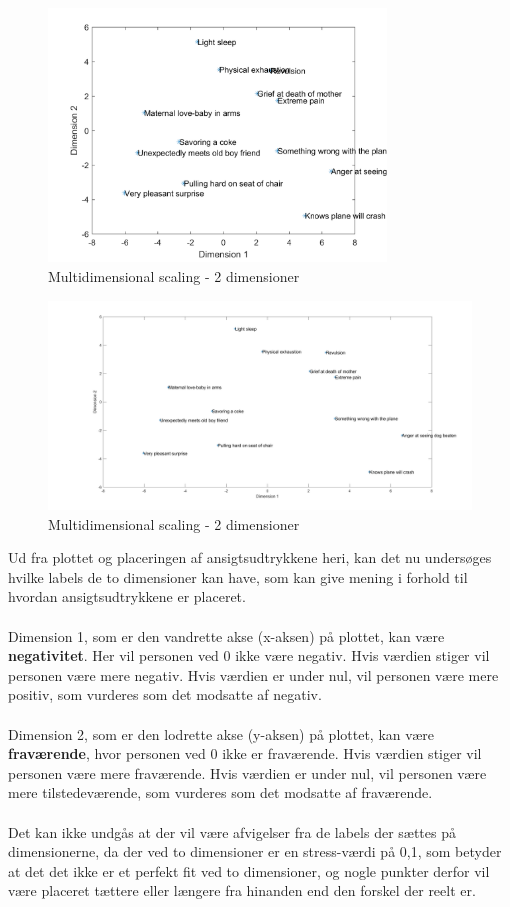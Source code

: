 \begin{figure}[H]
\centering
\includegraphics[width = 0.8\textwidth]{Figure/multidimensional.png} 
\caption{Multidimensional scaling - 2 dimensioner}
\label{fig:MDS}
\end{figure}

\begin{figure}[H]
\centering
\includegraphics[width = 1.5\textwidth]{Figure/MDS_plot} 
\caption{Multidimensional scaling - 2 dimensioner}
\label{fig:MDS}
\end{figure}

\noindent Ud fra plottet og placeringen af ansigtsudtrykkene heri, kan det nu undersøges hvilke labels de to dimensioner kan have, som kan give mening i forhold til hvordan ansigtsudtrykkene er placeret. 
\\\\
Dimension 1, som er den vandrette akse (x-aksen) på plottet, kan være \textbf{negativitet}. Her vil personen ved 0 ikke være negativ. Hvis værdien stiger vil personen være mere negativ. Hvis værdien er under nul, vil personen være mere positiv, som vurderes som det modsatte af negativ. 
\\\\
Dimension 2, som er den lodrette akse (y-aksen) på plottet, kan være \textbf{fraværende}, hvor personen ved 0 ikke er fraværende. Hvis værdien stiger vil personen være mere fraværende. Hvis værdien er under nul, vil personen være mere tilstedeværende, som vurderes som det modsatte af fraværende. 
\\\\
Det kan ikke undgås at der vil være afvigelser fra de labels der sættes på dimensionerne, da der ved to dimensioner er en stress-værdi på 0,1, som betyder at det det ikke er et perfekt fit ved to dimensioner, og nogle punkter derfor vil være placeret tættere eller længere fra hinanden end den forskel der reelt er.